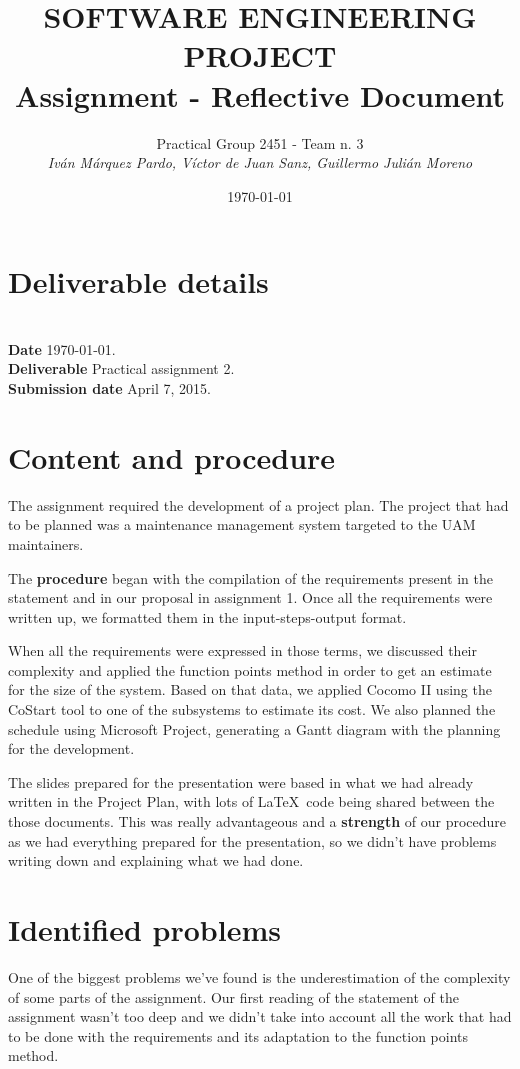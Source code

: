 \documentclass{article}
\title{SOFTWARE ENGINEERING PROJECT\\Assignment  - Reflective Document}
\date{\today}
\author{Practical Group 2451 - Team n. 3 \\ \vspace{5pt} \textit{Iván Márquez Pardo, Víctor de Juan Sanz, Guillermo Julián Moreno}}
\newcommand{\header}[1]{\\ \indent \textbf{#1}\hspace{10pt}}
\begin{document}
\maketitle
\pagestyle{plain}

\section{Deliverable details}

\noindent
\header{Date} \today.
\header{Deliverable} Practical assignment 2.
\header{Submission date} April 7, 2015.

\section{Content and procedure}

The assignment required the development of a project plan. The project that had to be planned was a maintenance management system targeted to the UAM maintainers.

The \textbf{procedure} began with the compilation of the requirements present in the statement and in our proposal in assignment 1. Once all the requirements were written up, we formatted them in the input-steps-output format.

When all the requirements were expressed in those terms, we discussed their complexity and applied the function points method in order to get an estimate for the size of the system. Based on that data, we applied Cocomo II using the CoStart tool to one of the subsystems to estimate its cost. We also planned the schedule using Microsoft Project, generating a Gantt diagram with the planning for the development.

The slides prepared for the presentation were based in what we had already written in the Project Plan, with lots of \LaTeX\ code being shared between the those documents. This was really advantageous and a \textbf{strength} of our procedure as we had everything prepared for the presentation, so we didn't have problems writing down and explaining what we had done.

\section{Identified problems}

One of the biggest problems we've found is the underestimation of the complexity of some parts of the assignment. Our first reading of the statement of the assignment wasn't too deep and we didn't take into account all the work that had to be done with the requirements and its adaptation to the function points method.
\end{document}
